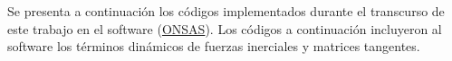 \chapter{}\label{Ape1}

Se presenta a continuación los códigos implementados durante el transcurso de este trabajo en el software (\href{https://github.com/ONSAS/ONSAS/}{ONSAS}). Los códigos a continuación incluyeron al software los términos dinámicos de fuerzas inerciales y matrices tangentes. 


%
